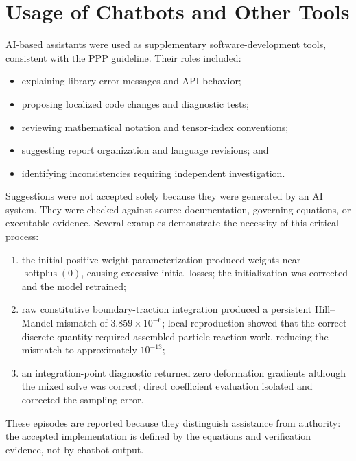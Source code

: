 \chapter{Usage of Chatbots and Other Tools}
\label{ch:ai-tools}

AI-based assistants were used as supplementary software-development tools,
consistent with the PPP guideline. Their roles included:
\begin{itemize}
  \item explaining library error messages and API behavior;
  \item proposing localized code changes and diagnostic tests;
  \item reviewing mathematical notation and tensor-index conventions;
  \item suggesting report organization and language revisions; and
  \item identifying inconsistencies requiring independent investigation.
\end{itemize}

Suggestions were not accepted solely because they were generated by an AI
system. They were checked against source documentation, governing equations,
or executable evidence. Several examples demonstrate the necessity of this
critical process:
\begin{enumerate}
  \item the initial positive-weight parameterization produced weights near
        \(\operatorname{softplus}(0)\), causing excessive initial losses; the
        initialization was corrected and the model retrained;
  \item raw constitutive boundary-traction integration produced a persistent
        Hill--Mandel mismatch of \(3.859\times10^{-6}\); local reproduction
        showed that the correct discrete quantity required assembled particle
        reaction work, reducing the mismatch to approximately \(10^{-13}\);
  \item an integration-point diagnostic returned zero deformation gradients
        although the mixed solve was correct; direct coefficient evaluation
        isolated and corrected the sampling error.
\end{enumerate}

These episodes are reported because they distinguish assistance from
authority: the accepted implementation is defined by the equations and
verification evidence, not by chatbot output.
